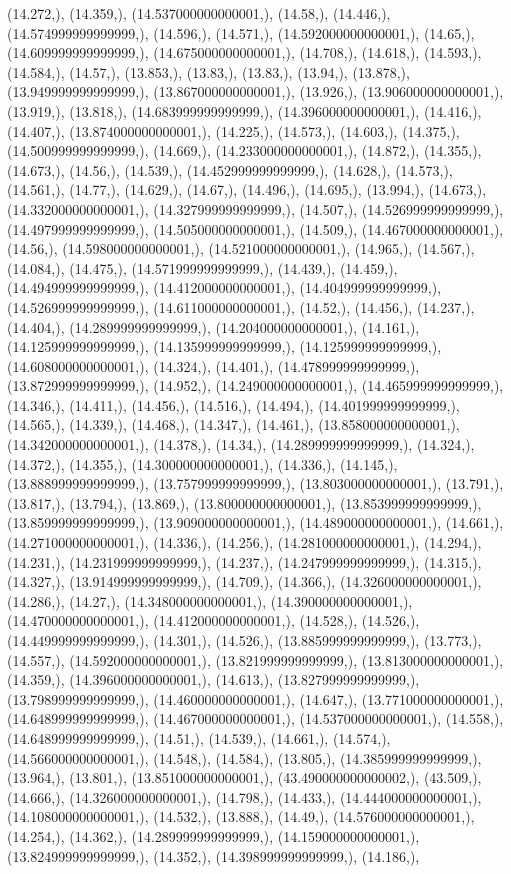 \documentclass{article}
\begin{document}
(14.272,), (14.359,), (14.537000000000001,), (14.58,), (14.446,), (14.574999999999999,), (14.596,), (14.571,), (14.592000000000001,), (14.65,), (14.609999999999999,), (14.675000000000001,), (14.708,), (14.618,), (14.593,), (14.584,), (14.57,), (13.853,), (13.83,), (13.83,), (13.94,), (13.878,), (13.949999999999999,), (13.867000000000001,), (13.926,), (13.906000000000001,), (13.919,), (13.818,), (14.683999999999999,), (14.396000000000001,), (14.416,), (14.407,), (13.874000000000001,), (14.225,), (14.573,), (14.603,), (14.375,), (14.500999999999999,), (14.669,), (14.233000000000001,), (14.872,), (14.355,), (14.673,), (14.56,), (14.539,), (14.452999999999999,), (14.628,), (14.573,), (14.561,), (14.77,), (14.629,), (14.67,), (14.496,), (14.695,), (13.994,), (14.673,), (14.332000000000001,), (14.327999999999999,), (14.507,), (14.526999999999999,), (14.497999999999999,), (14.505000000000001,), (14.509,), (14.467000000000001,), (14.56,), (14.598000000000001,), (14.521000000000001,), (14.965,), (14.567,), (14.084,), (14.475,), (14.571999999999999,), (14.439,), (14.459,), (14.494999999999999,), (14.412000000000001,), (14.404999999999999,), (14.526999999999999,), (14.611000000000001,), (14.52,), (14.456,), (14.237,), (14.404,), (14.289999999999999,), (14.204000000000001,), (14.161,), (14.125999999999999,), (14.135999999999999,), (14.125999999999999,), (14.608000000000001,), (14.324,), (14.401,), (14.478999999999999,), (13.872999999999999,), (14.952,), (14.249000000000001,), (14.465999999999999,), (14.346,), (14.411,), (14.456,), (14.516,), (14.494,), (14.401999999999999,), (14.565,), (14.339,), (14.468,), (14.347,), (14.461,), (13.858000000000001,), (14.342000000000001,), (14.378,), (14.34,), (14.289999999999999,), (14.324,), (14.372,), (14.355,), (14.300000000000001,), (14.336,), (14.145,), (13.888999999999999,), (13.757999999999999,), (13.803000000000001,), (13.791,), (13.817,), (13.794,), (13.869,), (13.800000000000001,), (13.853999999999999,), (13.859999999999999,), (13.909000000000001,), (14.489000000000001,), (14.661,), (14.271000000000001,), (14.336,), (14.256,), (14.281000000000001,), (14.294,), (14.231,), (14.231999999999999,), (14.237,), (14.247999999999999,), (14.315,), (14.327,), (13.914999999999999,), (14.709,), (14.366,), (14.326000000000001,), (14.286,), (14.27,), (14.348000000000001,), (14.390000000000001,), (14.470000000000001,), (14.412000000000001,), (14.528,), (14.526,), (14.449999999999999,), (14.301,), (14.526,), (13.885999999999999,), (13.773,), (14.557,), (14.592000000000001,), (13.821999999999999,), (13.813000000000001,), (14.359,), (14.396000000000001,), (14.613,), (13.827999999999999,), (13.798999999999999,), (14.460000000000001,), (14.647,), (13.771000000000001,), (14.648999999999999,), (14.467000000000001,), (14.537000000000001,), (14.558,), (14.648999999999999,), (14.51,), (14.539,), (14.661,), (14.574,), (14.566000000000001,), (14.548,), (14.584,), (13.805,), (14.385999999999999,), (13.964,), (13.801,), (13.851000000000001,), (43.490000000000002,), (43.509,), (14.666,), (14.326000000000001,), (14.798,), (14.433,), (14.444000000000001,), (14.108000000000001,), (14.532,), (13.888,), (14.49,), (14.576000000000001,), (14.254,), (14.362,), (14.289999999999999,), (14.159000000000001,), (13.824999999999999,), (14.352,), (14.398999999999999,), (14.186,), 
\end{document}
